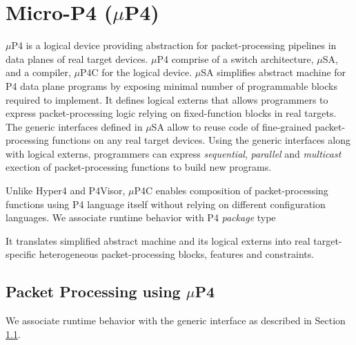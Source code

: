 \section{Micro-P4 \;($\mu$P4)}

$\mu$P4 is a logical device providing abstraction for packet-processing pipelines in data planes of real target devices.
$\mu$P4 comprise of a switch architecture, $\mu$SA, and a compiler, $\mu$P4C for the logical device. 
$\mu$SA simplifies abstract machine for P4 data plane programs by exposing minimal number of programmable blocks required to implement.
It defines logical externs that allows programmers to express packet-processing logic relying on fixed-function blocks in real targets.
The generic interfaces defined in $\mu$SA allow to reuse code of fine-grained packet-processing functions on any real target devices.
Using the generic interfaces along with logical externs, programmers can express \emph{sequential}, \emph{parallel} and \emph{multicast} exection of packet-processing functions to build new programs.

Unlike Hyper4 and P4Visor, $\mu$P4C enables composition of packet-processing functions using P4 language itself without relying on different configuration languages.
We associate runtime behavior with P4 \emph{package} type 

It translates simplified abstract machine and its logical externs into real target-specific heterogeneous packet-processing blocks, features and constraints.

\subsection{Packet Processing using $\mu$P4}
\label{subsection:packet-processing-using-mp4}

We associate runtime behavior with the generic interface as described in Section \ref{subsection:packet-processing-using-mp4}.


